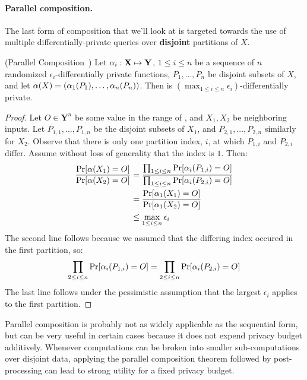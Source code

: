 \documentclass[11pt,twoside]{scrartcl}
\begin{document}
\paragraph{Parallel composition.} The last form of composition that we'll look at is targeted towards the use of multiple differentially-private queries over \textbf{disjoint} partitions of $X$.

\begin{theorem}{(Parallel Composition~\cite{McSherry2009})}
Let $\alpha_i : \mathbf{X} \mapsto \mathbf{Y}$, $1 \le i \le n$ be a sequence of $n$ randomized $\epsilon_i$-differentially private functions, $P_1, \ldots, P_n$ be disjoint subsets of $X$, and let $\alpha(X) = (\alpha_1(P_1), \ldots, \alpha_n(P_n))$. Then \san is $(\max_{1 \le i \le n} \epsilon_i)$-differentially private.
\end{theorem}

\begin{proof}
Let $O \in \mathbf{Y}^n$ be some value in the range of \san, and $X_1, X_2$ be neighboring inputs. Let $P_{1,1}, \ldots, P_{1,n}$ be the disjoint subsets of $X_1$, and $P_{2,1}, \ldots, P_{2,n}$ similarly for $X_2$. Observe that there is only one partition index, $i$, at which $P_{1,i}$ and $P_{2,i}$ differ. Assume without loss of generality that the index is $1$. Then:
\begin{align*}
\frac{
  \mathrm{Pr}[\alpha(X_1) = O]
}{
  \mathrm{Pr}[\alpha(X_2) = O]
}
&=
\frac{
  \prod_{1 \le i \le n} \mathrm{Pr}[\alpha_i(P_{1,i}) = O]
}{
  \prod_{1 \le i \le n} \mathrm{Pr}[\alpha_i(P_{2,i}) = O]
}
\\
&=
\frac{
  \mathrm{Pr}[\alpha_1(X_1) = O]
}{
  \mathrm{Pr}[\alpha_1(X_2) = O]
}
\\
&\le
\max_{1 \le i \le n} \epsilon_i
\end{align*}
The second line follows because we assumed that the differing index occured in the first partition, so:
\[
\prod_{2 \le i \le n} \mathrm{Pr}[\alpha_i(P_{1,i}) = O] = \prod_{2 \le i \le n} \mathrm{Pr}[\alpha_i(P_{2,i}) = O]
\]
The last line follows under the pessimistic assumption that the largest $\epsilon_i$ applies to the first partition.
\end{proof}

Parallel composition is probably not as widely applicable as the sequential form, but can be very useful in certain cases because it does not expend privacy budget additively. Whenever computations can be broken into smaller sub-computations over disjoint data, applying the parallel composition theorem followed by post-processing can lead to strong utility for a fixed privacy budget.



\end{document}
